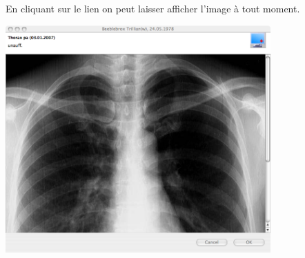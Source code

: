 En cliquant sur le lien on peut laisser afficher l'image à tout moment.

\includegraphics[width=4in]{images/bild3}
